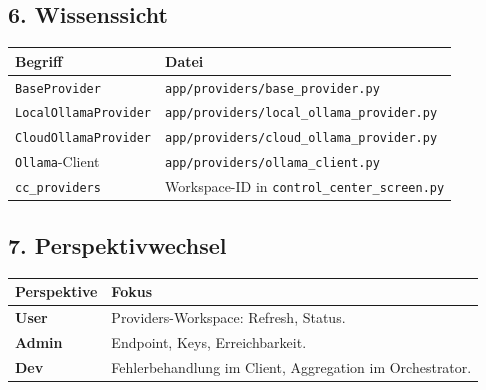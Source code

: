 \subsection{6. Wissenssicht}

\begin{center}
\begin{tabular}{ll}
\hline
Begriff & Datei \\
\hline
\texttt{BaseProvider} & \texttt{app/providers/base\_provider.py} \\
\texttt{LocalOllamaProvider} & \texttt{app/providers/local\_ollama\_provider.py} \\
\texttt{CloudOllamaProvider} & \texttt{app/providers/cloud\_ollama\_provider.py} \\
\texttt{Ollama}-Client & \texttt{app/providers/ollama\_client.py} \\
\texttt{cc\_providers} & Workspace-ID in \texttt{control\_center\_screen.py} \\
\hline
\end{tabular}
\end{center}

\subsection{7. Perspektivwechsel}

\begin{center}
\begin{tabular}{ll}
\hline
Perspektive & Fokus \\
\hline
\textbf{User} & Providers-Workspace: Refresh, Status. \\
\textbf{Admin} & Endpoint, Keys, Erreichbarkeit. \\
\textbf{Dev} & Fehlerbehandlung im Client, Aggregation im Orchestrator. \\
\hline
\end{tabular}
\end{center}
